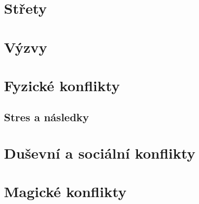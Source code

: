 \documentclass[../main.tex]{subfiles}
\begin{document}
\section{Střety}
\label{sec:strety}

\section{Výzvy}
\label{sec:vyzvy}

\section{Fyzické konflikty}
\label{sec:boj}

\subsection{Stres a následky}
\label{sec:stres-nasledky}

\section{Duševní a sociální konflikty}
\label{sec:dusevni-soc-konflikty}

\section{Magické konflikty}
\label{sec:magicke-konflikty}
\end{document}
